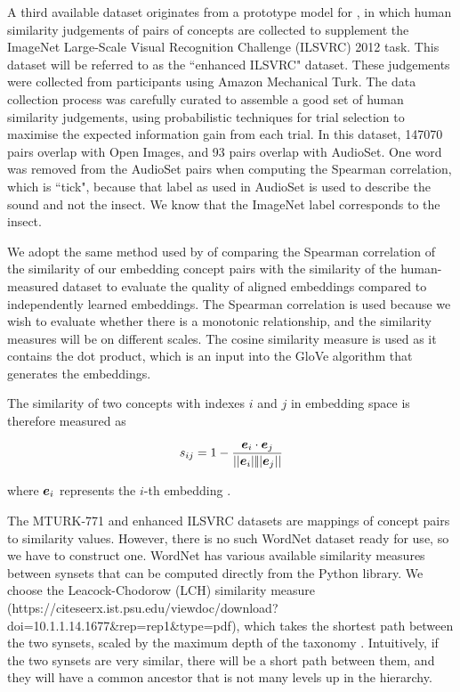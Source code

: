 A third available dataset originates from a prototype model for \cite{RoadsLoveCVPR}, in which human similarity judgements of pairs of concepts are collected to supplement the ImageNet Large-Scale Visual Recognition Challenge (ILSVRC) 2012 task. This dataset will be referred to as the ``enhanced ILSVRC" dataset. These judgements were collected from participants using Amazon Mechanical Turk. The data collection process was carefully curated to assemble a good set of human similarity judgements, using probabilistic techniques for trial selection to maximise the expected information gain from each trial. In this dataset, 147070 pairs overlap with Open Images, and 93 pairs overlap with AudioSet. One word was removed from the AudioSet pairs when computing the Spearman correlation, which is ``tick", because that label as used in AudioSet is used to describe the sound and not the insect. We know that the ImageNet label corresponds to the insect. 

We adopt the same method used by \cite{mturk771} of comparing the Spearman correlation of the similarity of our embedding concept pairs with the similarity of the human-measured dataset to evaluate the quality of aligned embeddings compared to independently learned embeddings. The Spearman correlation is used because we wish to evaluate whether there is a monotonic relationship, and the similarity measures will be on different scales. The cosine similarity measure is used as it contains the dot product, which is an input into the GloVe algorithm that generates the embeddings.

The similarity of two concepts with indexes $i$ and $j$ in embedding space is therefore measured as

\begin{equation}
s_{ij} = 1 - \frac{\boldsymbol{e}_i \cdot \boldsymbol{e}_j}{||\boldsymbol{e}_i||\!||\boldsymbol{e}_j||}
\end{equation}

where $\boldsymbol{e}_i$ represents the $i$-th embedding .

The MTURK-771 and enhanced ILSVRC datasets are mappings of concept pairs to similarity values. However, there is no such WordNet dataset ready for use, so we have to construct one. WordNet has various available similarity measures between synsets that can be computed directly from the Python library. We choose the Leacock-Chodorow (LCH) similarity measure (https://citeseerx.ist.psu.edu/viewdoc/download?doi=10.1.1.14.1677&rep=rep1&type=pdf), which takes the shortest path between the two synsets, scaled by the maximum depth of the taxonomy . Intuitively, if the two synsets are very similar, there will be a short path between them, and they will have a common ancestor that is not many levels up in the hierarchy. 

